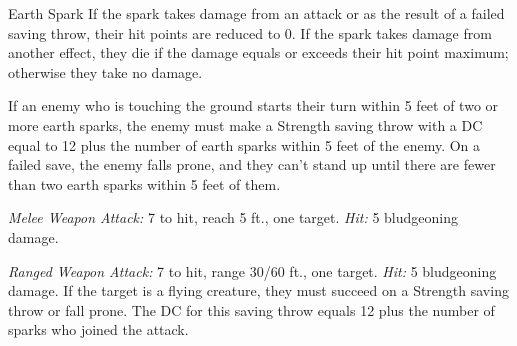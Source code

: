 \documentclass[10pt,a4paper,twoside,bg=print,twocolumn,openany,nodeprecatedcode]{dndbook}
\begin{document}
\begin{DndMonster}[float=t]{Earth Spark}
\DndMonsterBasics[
armor-class = {18 (natural armor)},
hit-points = {\DndDice{17}},
speed = {30 ft., burrow 20 ft.}
]
\DndMonsterAbilityScores[
 str = 16,
 dex = 8,
 con = 16,
 int = 9,
 wis = 10,
 cha = 12
]
\DndMonsterDetails[
damage-immunities = {poison},
condition-immunities = {poisoned},
senses = {darkvision 60 ft., passive perception 10},
languages = {Common, Terran},
challenge = 10,
]
If the spark takes damage from an attack or as the result of a failed saving throw, their hit points are reduced to 0. If the spark takes damage from another effect, they die if the damage equals or exceeds their hit point maximum; otherwise they take no damage.

If an enemy who is touching the ground starts their turn within 5 feet of two or more earth sparks, the enemy must make a Strength saving throw with a DC equal to 12 plus the number of earth sparks within 5 feet of the enemy. On a failed save, the enemy falls prone, and they can't stand up until there are fewer than two earth sparks within 5 feet of them.

\textsl{Melee Weapon Attack:} 7 to hit, reach 5 ft., one target. \textsl{Hit:} 5 bludgeoning damage.

\textsl{Ranged Weapon Attack:} 7 to hit, range 30/60 ft., one target. \textsl{Hit:} 5 bludgeoning damage. If the target is a flying creature, they must succeed on a Strength saving throw or fall prone. The DC for this saving throw equals 12 plus the number of sparks who joined the attack.

\end{DndMonster}
\end{document}

